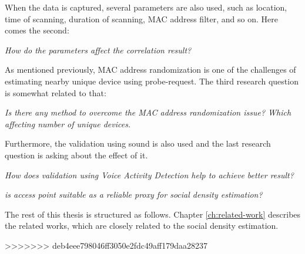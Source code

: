 When the data is captured, several parameters are also used, such as location, time of scanning, duration of scanning, MAC address filter, and so on. Here comes the second:
\begin{displayquote}\textit{
How do the parameters affect the correlation result?}
\end{displayquote}

As mentioned previously, MAC address randomization is one of the challenges of estimating nearby unique device using probe-request. The third research question is somewhat related to that:
\begin{displayquote}\textit{
Is there any method to overcome the MAC address randomization issue? Which affecting number of unique devices.}
\end{displayquote}

Furthermore, the validation using sound is also used and the last research question is asking about the effect of it.
\begin{displayquote}\textit{
How does validation using Voice Activity Detection help to achieve better result?}
\end{displayquote}

\begin{displayquote}
	\textit{is access point suitable as a reliable proxy for social density estimation?}
\end{displayquote}

The rest of this thesis is structured as follows. Chapter \ref{ch:related-work} describes the related works, which are closely related to the social density estimation.

>>>>>>> deb4eee798046ff3050e2fdc49aff179daa28237





